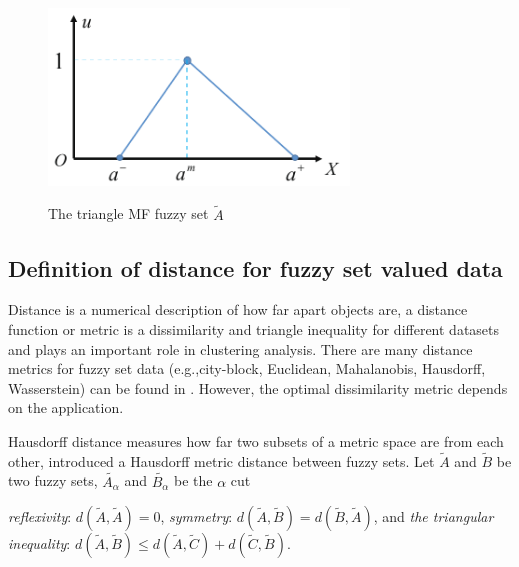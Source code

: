 \documentclass[preprint,12pt,authoryear]{elsarticle}
\begin{document}
\begin{figure}
  \centering
  \includegraphics[width=8cm]{figures/Fig1}\\
  \caption{The triangle MF fuzzy set $\tilde{A}$}\label{fig:1}
\end{figure}


\subsection{Definition of distance for fuzzy set valued data}

Distance is a numerical description of how far apart objects are, a distance function or metric  is a dissimilarity and triangle inequality for different datasets and plays an important role in clustering analysis. There are many distance metrics for fuzzy set data (e.g.,city-block, Euclidean, Mahalanobis, Hausdorff, Wasserstein) can be found in \citep{wang1997new, zwick1987measures, diamond1994metric, chaudhur1996metric, saha2002fuzzy, de2006adaptive, irpino2014dynamic}. However, the optimal dissimilarity metric depends on the application.

Hausdorff distance measures how far two subsets of a metric space are from each other, \cite{chaudhur1996metric} introduced a Hausdorff metric distance between fuzzy sets. Let $\tilde{A}$ and $\tilde{B}$ be two fuzzy sets, $\tilde{A_{\alpha}}$ and $\tilde{B_{\alpha}}$  be the $\alpha$  cut


\textsl{reflexivity}: $d(\tilde{A}, \tilde{A}) = 0$, \textsl{symmetry}: $d(\tilde{A}, \tilde{B}) = d(\tilde{B}, \tilde{A})$, and  \textsl{the triangular inequality}: $d(\tilde{A}, \tilde{B}) \leq d(\tilde{A}, \tilde{C}) + d(\tilde{C}, \tilde{B})$.
\end{document}

